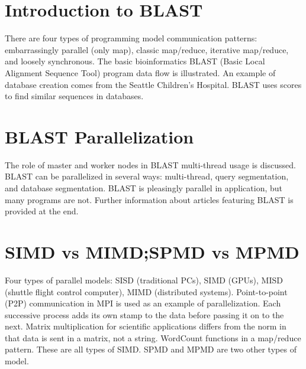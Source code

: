 \section{Introduction to BLAST}

There are four types of programming model communication patterns:
embarrassingly parallel (only map), classic map/reduce, iterative
map/reduce, and loosely synchronous. The basic bioinformatics BLAST
(Basic Local Alignment Sequence Tool) program data flow is illustrated.
An example of database creation comes from the Seattle Children's
Hospital. BLAST uses scores to find similar sequences in databases.



\section{BLAST Parallelization}

The role of master and worker nodes in BLAST multi-thread usage is
discussed. BLAST can be parallelized in several ways: multi-thread,
query segmentation, and database segmentation. BLAST is pleasingly
parallel in application, but many programs are not. Further information
about articles featuring BLAST is provided at the end.



\section{SIMD vs MIMD;SPMD vs MPMD}

Four types of parallel models: SISD (traditional PCs), SIMD (GPUs), MISD
(shuttle flight control computer), MIMD (distributed systems).
Point-to-point (P2P) communication in MPI is used as an example of
parallelization. Each successive process adds its own stamp to the data
before passing it on to the next. Matrix multiplication for scientific
applications differs from the norm in that data is sent in a matrix, not
a string. WordCount functions in a map/reduce pattern. These are all
types of SIMD. SPMD and MPMD are two other types of model.

